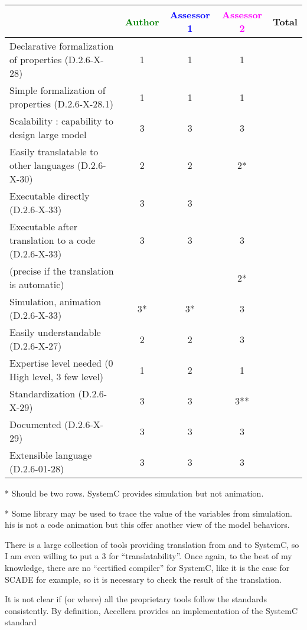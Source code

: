 \begin{tabular}{|l | c | c | c | c|}
  \hline
  & \textcolor{green}{Author} & \textcolor{blue}{Assessor 1} & \textcolor{magenta}{Assessor 2} & Total \\
  \hline
  Declarative formalization of properties (D.2.6-X-28) &1 &1 & 1& \\
  \hline
  Simple formalization of properties (D.2.6-X-28.1) &1 &1 &1 & \\
  \hline
  Scalability : capability to design large model &3 &3 & 3 & \\
  \hline
  Easily translatable to other languages (D.2.6-X-30) & 2 & 2  & 2* & \\
  \hline
  Executable directly (D.2.6-X-33) &3 & 3  & & \\
  \hline
  Executable after translation to a code (D.2.6-X-33) &3 &3 &3 & \\
  (precise if the translation is automatic) & & & 2*& \\
  \hline
  Simulation, animation (D.2.6-X-33) &3* &3* &3 & \\
  \hline
  Easily understandable (D.2.6-X-27) &2 &2 &3 & \\
  \hline
  Expertise level needed (0 High level, 3 few level) &1 &2 &1 & \\
  \hline
  Standardization (D.2.6-X-29) &3 &3 &3** & \\
  \hline
  Documented (D.2.6-X-29) &3 &3 &3 & \\
  \hline
  Extensible language (D.2.6-01-28) &3 &3 &3 & \\
  \hline
\end{tabular}

\begin{author_comment}
* Should be two rows. SystemC provides simulation but not animation.
\end{author_comment}
\begin{assessor1}
* Some library may be used to trace the value of  the variables from
simulation. his is not a code animation but this offer another view of
the model behaviors.
\end{assessor1}

\begin{assessor2}
\item[(*)] There is a large collection of tools providing translation
  from and to SystemC, so I am even willing to put a 3 for
  ``translatability''. Once again, to the best of my knowledge, there
  are no ``certified compiler'' for SystemC, like it is the case for
  SCADE for example, so it is necessary to check the result of the
  translation.
\item[(**)] It is not clear if (or where) all the proprietary tools
  follow the standards consistently. By definition, Accellera provides
  an implementation of the SystemC standard 
\end{assessor2}

